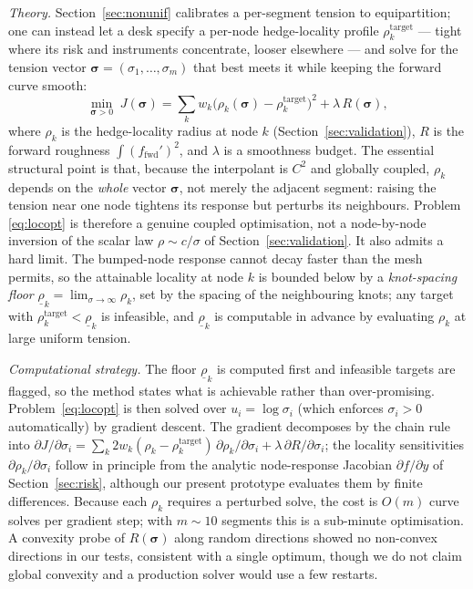 \documentclass[]{interact}
\theoremstyle{plain}
\begin{document}
\emph{Theory.} Section~\ref{sec:nonunif} calibrates a per-segment tension to equipartition; one
can instead let a desk specify a per-node hedge-locality profile $\rho_k^{\mathrm{target}}$ ---
tight where its risk and instruments concentrate, looser elsewhere --- and solve for the tension
vector $\boldsymbol{\sigma}=(\sigma_1,\dots,\sigma_m)$ that best meets it while keeping the
forward curve smooth:
\begin{equation}
\min_{\boldsymbol{\sigma}>0}\;
J(\boldsymbol{\sigma})=\sum_k w_k\big(\rho_k(\boldsymbol{\sigma})-\rho_k^{\mathrm{target}}\big)^2
+\lambda\,R(\boldsymbol{\sigma}),
\label{eq:locopt}
\end{equation}
where $\rho_k$ is the hedge-locality radius at node $k$ (Section~\ref{sec:validation}), $R$ is the
forward roughness $\int(f_{\mathrm{fwd}}')^2$, and $\lambda$ is a smoothness budget. The essential
structural point is that, because the interpolant is $C^2$ and globally coupled, $\rho_k$ depends
on the \emph{whole} vector $\boldsymbol{\sigma}$, not merely the adjacent segment: raising the
tension near one node tightens its response but perturbs its neighbours. Problem
\eqref{eq:locopt} is therefore a genuine coupled optimisation, not a node-by-node inversion of the
scalar law $\rho\sim c/\sigma$ of Section~\ref{sec:validation}. It also admits a hard limit. The
bumped-node response cannot decay faster than the mesh permits, so the attainable locality at node
$k$ is bounded below by a \emph{knot-spacing floor} $\underline{\rho}_k=\lim_{\sigma\to\infty}
\rho_k$, set by the spacing of the neighbouring knots; any target with
$\rho_k^{\mathrm{target}}<\underline{\rho}_k$ is infeasible, and $\underline{\rho}_k$ is
computable in advance by evaluating $\rho_k$ at large uniform tension.

\emph{Computational strategy.} The floor $\underline{\rho}_k$ is computed first and infeasible
targets are flagged, so the method states what is achievable rather than over-promising.
Problem~\eqref{eq:locopt} is then solved over $u_i=\log\sigma_i$ (which enforces
$\sigma_i>0$ automatically) by gradient descent. The gradient decomposes by the chain rule into
$\partial J/\partial\sigma_i = \sum_k 2w_k(\rho_k-\rho_k^{\mathrm{target}})\,
\partial\rho_k/\partial\sigma_i + \lambda\,\partial R/\partial\sigma_i$; the locality
sensitivities $\partial\rho_k/\partial\sigma_i$ follow in principle from the analytic
node-response Jacobian $\partial f/\partial y$ of Section~\ref{sec:risk}, although our present
prototype evaluates them by finite differences. Because each $\rho_k$ requires a perturbed solve,
the cost is $O(m)$ curve solves per gradient step; with $m\!\sim\!10$ segments this is a
sub-minute optimisation. A convexity probe of $R(\boldsymbol{\sigma})$ along random directions
showed no non-convex directions in our tests, consistent with a single optimum, though we do not
claim global convexity and a production solver would use a few restarts.
\end{document}
